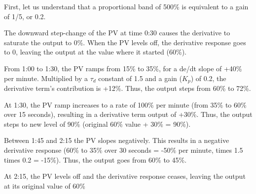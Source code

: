First, let us understand that a proportional band of 500\% is equivalent to a gain of 1/5, or 0.2.

\vskip 10pt

The downward step-change of the PV at time 0:30 causes the derivative to saturate the output to 0\%.  When the PV levels off, the derivative response goes to 0, leaving the output at the value where it started (60\%).

From 1:00 to 1:30, the PV ramps from 15\% to 35\%, for a de/dt slope of +40\% per minute.  Multiplied by a $\tau_d$ constant of 1.5 and a gain ($K_p$) of 0.2, the derivative term's contribution is +12\%.  Thus, the output steps from 60\% to 72\%.

At 1:30, the PV ramp increases to a rate of 100\% per minute (from 35\% to 60\% over 15 seconds), resulting in a derivative term output of +30\%.  Thus, the output steps to new level of 90\% (original 60\% value + 30\% = 90\%).

Between 1:45 and 2:15 the PV slopes negatively.  This results in a negative derivative response (60\% to 35\% over 30 seconds = -50\% per minute, times 1.5 times 0.2 = -15\%).  Thus, the output goes from 60\% to 45\%.

At 2:15, the PV levels off and the derivative response ceases, leaving the output at its original value of 60\%







 



